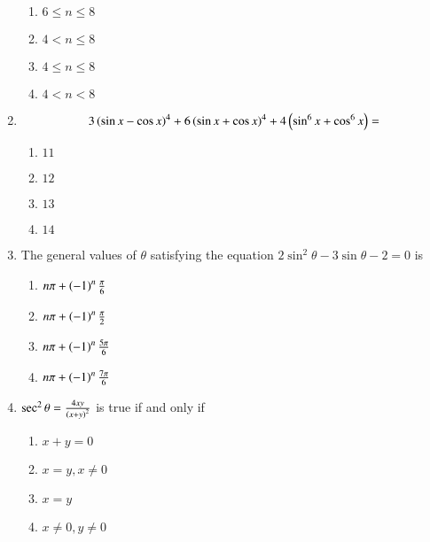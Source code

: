 \begin{enumerate}[label=\thesubsection.\arabic*,ref=\thesubsection.\theenumi]
        \hfill{}
        \begin{enumerate}
                \item $6\le n\le8$
                \item $4<n\le8$
                \item $4\le n\le8$  
                \item $4<n<8$
        \end{enumerate}


	\item \begin{multline*}
		3\left(\sin{x} - \cos{x}\right)^4 + 6\left(\sin{x} + \cos{x}\right)^4 +  4\left(\sin^6{x}+\cos^6{x}\right) =
	\end{multline*}
        
        \hfill{}
        \begin{enumerate}
                \item $11$
                \item $12$
                \item $13$
                \item $14$
        \end{enumerate}   

    \item The general values of $\theta$ satisfying the equation $2\sin^2{\theta}-3\sin{\theta}-2=0$ is
        
        \hfill{}
        \begin{enumerate}
                \item $n\pi + \left(-1\right)^n\frac{\pi}{6}$
                \item $n\pi + \left(-1\right)^n\frac{\pi}{2}$
                \item $n\pi + \left(-1\right)^n\frac{5\pi}{6}$ 
                \item $n\pi + \left(-1\right)^n\frac{7\pi}{6}$
        \end{enumerate}

    \item $\sec^2{\theta} = \frac{4xy}{\left(x+y\right)^2}$ is true if and only if
        
        \hfill{}
        \begin{enumerate}
                \item $x+y=0$
                \item $x=y,x\neq0$
                \item $x=y$ 
                \item $x\neq0,y\neq0$
        \end{enumerate}
        

\end{enumerate}
